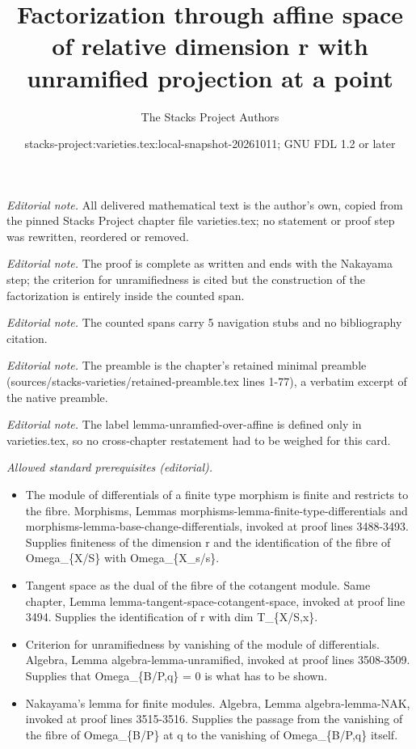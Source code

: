 \documentclass[10pt,a4paper]{amsart}
\title{Factorization through affine space of relative dimension r with unramified projection at a point}
\author{The Stacks Project Authors}
\date{stacks-project:varieties.tex:local-snapshot-20261011; GNU FDL 1.2 or later}
\theoremstyle{plain}
\theoremstyle{definition}
\theoremstyle{remark}
\numberwithin{equation}{subsection}
\begin{document}
\maketitle
\noindent\textit{Editorial note.} All delivered mathematical text is the author's own, copied from the pinned Stacks Project chapter file varieties.tex; no statement or proof step was rewritten, reordered or removed.\par\medskip
\noindent\textit{Editorial note.} The proof is complete as written and ends with the Nakayama step; the criterion for unramifiedness is cited but the construction of the factorization is entirely inside the counted span.\par\medskip
\noindent\textit{Editorial note.} The counted spans carry 5 navigation stubs and no bibliography citation.\par\medskip
\noindent\textit{Editorial note.} The preamble is the chapter's retained minimal preamble (sources/stacks-varieties/retained-preamble.tex lines 1-77), a verbatim excerpt of the native preamble.\par\medskip
\noindent\textit{Editorial note.} The label lemma-unramfied-over-affine is defined only in varieties.tex, so no cross-chapter restatement had to be weighed for this card.\par\medskip
\noindent\textit{Allowed standard prerequisites (editorial).}\begin{itemize}
\item The module of differentials of a finite type morphism is finite and restricts to the fibre. Morphisms, Lemmas morphisms-lemma-finite-type-differentials and morphisms-lemma-base-change-differentials, invoked at proof lines 3488-3493. Supplies finiteness of the dimension r and the identification of the fibre of Omega\_\{X/S\} with Omega\_\{X\_s/s\}.
\item Tangent space as the dual of the fibre of the cotangent module. Same chapter, Lemma lemma-tangent-space-cotangent-space, invoked at proof line 3494. Supplies the identification of r with dim T\_\{X/S,x\}.
\item Criterion for unramifiedness by vanishing of the module of differentials. Algebra, Lemma algebra-lemma-unramified, invoked at proof lines 3508-3509. Supplies that Omega\_\{B/P,q\} = 0 is what has to be shown.
\item Nakayama's lemma for finite modules. Algebra, Lemma algebra-lemma-NAK, invoked at proof lines 3515-3516. Supplies the passage from the vanishing of the fibre of Omega\_\{B/P\} at q to the vanishing of Omega\_\{B/P,q\} itself.
\end{itemize}\medskip
\end{document}
